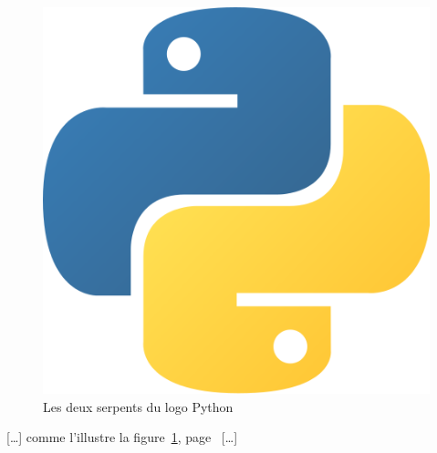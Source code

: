 \begin{figure}[here] %
    \includegraphics[height=0.2\textheight]{img/Python}
    \caption{Les deux serpents du logo Python} %
    \label{py} %
\end{figure} %
[…] comme l'illustre la figure~\ref{py}, page~\pageref{py} […]
